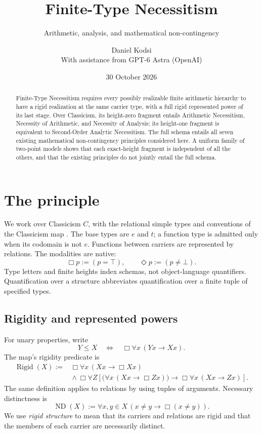 \documentclass[11pt,letterpaper,numbers=noenddot]{scrartcl}
\title{Finite-Type Necessitism}
\subtitle{Arithmetic, analysis, and mathematical non-contingency}
\author{Daniel Kodsi\\\small With assistance from GPT-6 Astra (OpenAI)}
\date{30 October 2026}
\numberwithin{equation}{section}
\theoremstyle{definition}
\newcommand{\Rigid}{\operatorname{Rigid}}
\newcommand{\ND}{\operatorname{ND}}
\begin{document}
\maketitle
\begin{abstract}
Finite-Type Necessitism requires every possibly realizable finite arithmetic hierarchy to have a rigid realization at the same carrier type, with a full rigid represented power of its last stage. Over Classicism, its height-zero fragment entails Arithmetic Necessitism, Necessity of Arithmetic, and Necessity of Analysis; its height-one fragment is equivalent to Second-Order Analytic Necessitism. The full schema entails all seven existing mathematical non-contingency principles considered here. A uniform family of two-point models shows that each exact-height fragment is independent of all the others, and that the existing principles do not jointly entail the full schema.
\end{abstract}

\section{The principle}

We work over Classicism $C$, with the relational simple types and conventions of the Classicism map \cite{map}. The base types are $e$ and $t$; a function type is admitted only when its codomain is not $e$. Functions between carriers are represented by relations. The modalities are native:
\[
\Box p:=(p=\top),\qquad \Diamond p:=(p\ne\bot).
\]
Type letters and finite heights index schemas, not object-language quantifiers. Quantification over a structure abbreviates quantification over a finite tuple of specified types.

\subsection{Rigidity and represented powers}

For unary properties, write
\[
Y\le X\quad\Longleftrightarrow\quad
\Box\forall x\,(Yx\to Xx).
\]
The map's rigidity predicate is
\begin{equation}\label{eq:rigidity}
\begin{split}
\Rigid(X):={}&\Box\forall x\,(Xx\to\Box Xx)\\
&{}\land\Box\forall Z\left[
  \bigl(\forall x\,(Xx\to\Box Zx)\bigr)
  \to\Box\forall x\,(Xx\to Zx)\right].
\end{split}
\end{equation}
The same definition applies to relations by using tuples of arguments. Necessary distinctness is
\[
\ND(X):=\forall x,y\in X\,(x\ne y\to\Box(x\ne y)).
\]
We use \emph{rigid structure} to mean that its carriers and relations are rigid and that the members of each carrier are necessarily distinct.
\end{document}
